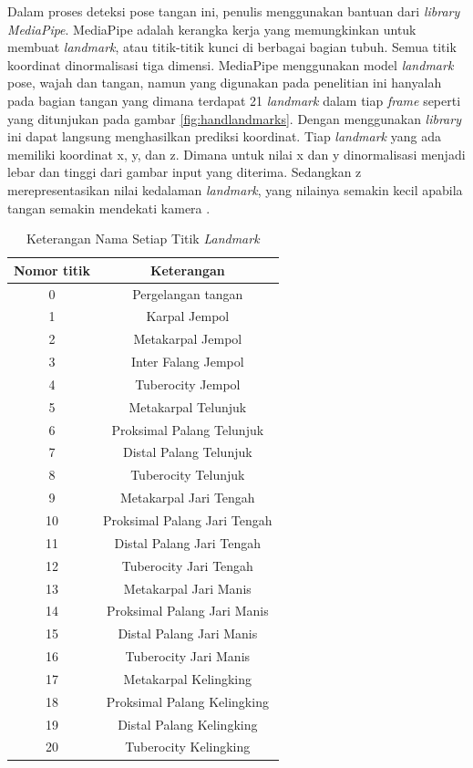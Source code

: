 Dalam proses deteksi pose tangan ini, penulis menggunakan bantuan dari \emph{\emph{library} MediaPipe}. MediaPipe adalah kerangka kerja yang memungkinkan untuk membuat \emph{landmark}, atau titik-titik kunci di berbagai bagian tubuh. Semua titik koordinat dinormalisasi tiga dimensi. MediaPipe menggunakan model \emph{landmark} pose, wajah dan tangan, namun yang digunakan pada penelitian ini hanyalah pada bagian tangan yang dimana terdapat 21 \emph{landmark} dalam tiap \emph{frame} seperti yang ditunjukan pada gambar \ref{fig:handlandmarks}. Dengan menggunakan \emph{\emph{library}} ini dapat langsung menghasilkan prediksi koordinat. Tiap \emph{landmark} yang ada memiliki koordinat x, y, dan z. Dimana untuk nilai x dan y dinormalisasi menjadi lebar dan tinggi dari gambar input yang diterima. Sedangkan z merepresentasikan nilai kedalaman \emph{landmark}, yang nilainya semakin kecil apabila tangan semakin mendekati kamera \parencite{Indriani2021}.

\begin{longtable}{|c|c|}
  \caption{Keterangan Nama Setiap Titik \emph{Landmark}}
  \label{tb:keterangansetiaptitiklandmark}\\
  \hline
  \textbf{Nomor titik} & \textbf{Keterangan} \\
  \hline
  \endhead
  0   & Pergelangan tangan  \\
  1   & Karpal Jempol   \\
  2   & Metakarpal Jempol   \\
  3   & Inter Falang Jempol  \\
  4   & Tuberocity Jempol  \\
  5   & Metakarpal Telunjuk  \\
  6   & Proksimal Palang Telunjuk  \\
  7   & Distal Palang Telunjuk  \\
  8   & Tuberocity Telunjuk  \\
  9   & Metakarpal Jari Tengah  \\
  10  & Proksimal Palang Jari Tengah  \\
  11  & Distal Palang Jari Tengah  \\
  12  & Tuberocity Jari Tengah  \\
  13  & Metakarpal Jari Manis  \\
  14  & Proksimal Palang Jari Manis  \\
  15  & Distal Palang Jari Manis  \\
  16  & Tuberocity Jari Manis  \\
  17  & Metakarpal Kelingking  \\
  18  & Proksimal Palang Kelingking  \\
  19  & Distal Palang Kelingking  \\
  20  & Tuberocity Kelingking  \\
  \hline
\end{longtable}

